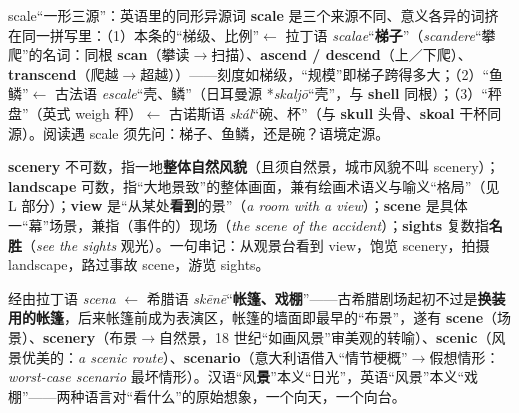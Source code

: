 \documentclass[../main.tex]{subfiles}
\begin{document}
\begin{gram}{scale“一形三源”：英语里的同形异源词}
\textbf{scale} 是三个来源不同、意义各异的词挤在同一拼写里：（1）本条的“梯级、比例”$\leftarrow$ 拉丁语 \textit{scalae}“\textbf{梯子}”（\textit{scandere}“攀爬”的名词：同根 \textbf{scan}（攀读$\to$扫描）、\textbf{ascend / descend}（上／下爬）、\textbf{transcend}（爬越$\to$超越））——刻度如梯级，“规模”即梯子跨得多大；（2）“鱼鳞”$\leftarrow$ 古法语 \textit{escale}“壳、鳞”（日耳曼源 *\textit{skaljō}“壳”，与 \textbf{shell} 同根）；（3）“秤盘”（英式 weigh 秤）$\leftarrow$ 古诺斯语 \textit{skál}“碗、杯”（与 \textbf{skull} 头骨、\textbf{skoal} 干杯同源）。阅读遇 scale 须先问：梯子、鱼鳞，还是碗？语境定源。
\end{gram}




\begin{lex}
\textbf{scenery} 不可数，指一地\textbf{整体自然风貌}（且须自然景，城市风貌不叫 scenery）；\textbf{landscape} 可数，指“大地景致”的整体画面，兼有绘画术语义与喻义“格局”（见 L 部分）；\textbf{view} 是“从某处\textbf{看到}的景”（\textit{a room with a view}）；\textbf{scene} 是具体一“幕”场景，兼指（事件的）现场（\textit{the scene of the accident}）；\textbf{sights} 复数指\textbf{名胜}（\textit{see the sights} 观光）。一句串记：从观景台看到 view，饱览 scenery，拍摄 landscape，路过事故 scene，游览 sights。
\end{lex}

\begin{origin}
经由拉丁语 \textit{scena} $\leftarrow$ 希腊语 \textit{skēnē}“\textbf{帐篷、戏棚}”——古希腊剧场起初不过是\textbf{换装用的帐篷}，后来帐篷前成为表演区，帐篷的墙面即最早的“布景”，遂有 \textbf{scene}（场景）、\textbf{scenery}（布景$\to$自然景，18 世纪“如画风景”审美观的转喻）、\textbf{scenic}（风景优美的：\textit{a scenic route}）、\textbf{scenario}（意大利语借入“情节梗概”$\to$假想情形：\textit{worst-case scenario} 最坏情形）。汉语“风\textbf{景}”本义“日光”，英语“风景”本义“戏棚”——两种语言对“看什么”的原始想象，一个向天，一个向台。
\end{origin}
\end{document}
